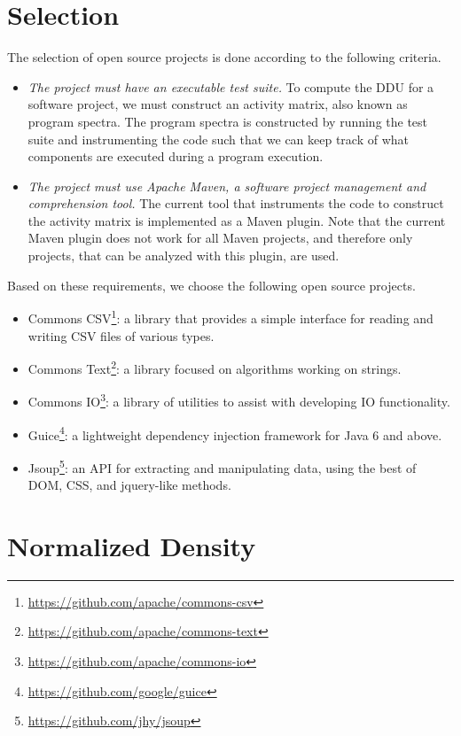 \documentclass[twoside,a4paper,11pt]{memoir}
\begin{document}
\section{Selection}

The selection of open source projects is done according to the following criteria.
\begin{itemize}
  \item \emph{The project must have an executable test suite.}
  To compute the DDU for a software project, we must construct an activity matrix, also known as program spectra.
  The program spectra is constructed by running the test suite and instrumenting the code such that we can keep track of what components are executed during a program execution.

  \item \emph{The project must use Apache Maven, a software project management and comprehension tool.}
  The current tool that instruments the code to construct the activity matrix is implemented as a Maven plugin.
  Note that the current Maven plugin does not work for all Maven projects, and therefore only projects, that can be analyzed with this plugin, are used.
\end{itemize}

Based on these requirements, we choose the following open source projects.

\begin{itemize}[noitemsep]
    \item Commons CSV\footnote{\url{https://github.com/apache/commons-csv}}: a library that provides a simple interface for reading and writing CSV files of various types.
    \item Commons Text\footnote{\url{https://github.com/apache/commons-text}}: a library focused on algorithms working on strings.
    \item Commons IO\footnote{\url{https://github.com/apache/commons-io}}: a library of utilities to assist with developing IO functionality.
    \item Guice\footnote{\url{https://github.com/google/guice}}: a lightweight dependency injection framework for Java 6 and above.
    \item Jsoup\footnote{\url{https://github.com/jhy/jsoup}}: an API for extracting and manipulating data, using the best of DOM, CSS, and jquery-like methods.
\end{itemize}



\section{Normalized Density}
\end{document}
